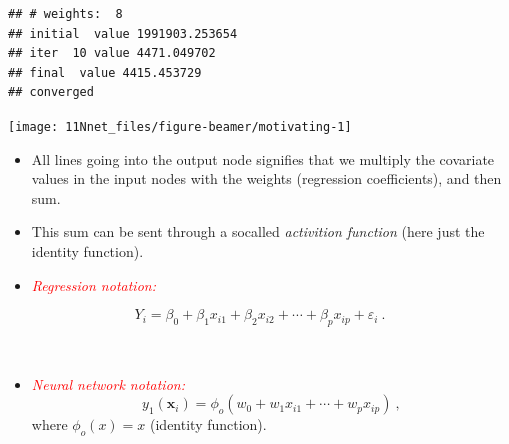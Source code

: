\documentclass[10pt,ignorenonframetext,]{beamer}
\providecommand{\tightlist}{%
  \setlength{\itemsep}{0pt}\setlength{\parskip}{0pt}}
\begin{document}
\begin{frame}[fragile]

\vspace{-20mm}

\scriptsize

\begin{verbatim}
## # weights:  8
## initial  value 1991903.253654 
## iter  10 value 4471.049702
## final  value 4415.453729 
## converged
\end{verbatim}

\begin{center}\texttt{[image: 11Nnet\_files/figure-beamer/motivating-1]} \end{center}

\normalsize

\begin{itemize}
\tightlist
\item
  All lines going into the output node signifies that we multiply the
  covariate values in the input nodes with the weights (regression
  coefficients), and then sum.
\item
  This sum can be sent through a socalled \emph{activition function}
  (here just the identity function).
\end{itemize}

\end{frame}

\begin{frame}

\begin{itemize}
\tightlist
\item
  \emph{\textcolor{red}{Regression notation:}}
\end{itemize}

\begin{equation*}
 Y_i=\beta_0 + \beta_1 x_{i1}+\beta_2 x_{i2}+\cdots + \beta_p x_{ip}+\varepsilon_i \ .
\end{equation*}

\(~\)

\begin{itemize}
\tightlist
\item
  \emph{\textcolor{red}{Neural network notation:}} \begin{equation*}
  y_1({\boldsymbol x}_i)=\phi_o(w_0+w_1 x_{i1}+\cdots + w_p x_{ip}) \ ,
  \end{equation*} where \(\phi_o(x)=x\) (identity function).
\end{itemize}

\end{frame}
\end{document}
